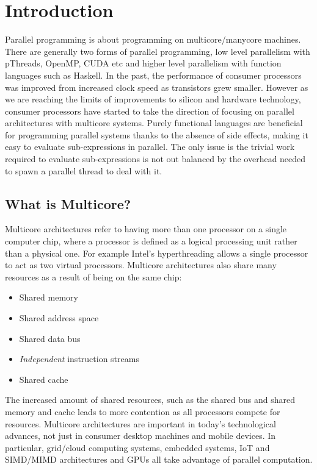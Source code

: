\documentclass[CS4204-Notes.tex]{subfiles}
\begin{document}
\section{Introduction}
Parallel programming is about programming on multicore/manycore machines. There are generally two forms of parallel programming, low level parallelism with pThreads, OpenMP, CUDA etc and higher level parallelism with function languages such as Haskell. 
\n
In the past, the performance of consumer processors was improved from increased clock speed as transistors grew smaller. However as we are reaching the limits of improvements to silicon and hardware technology, consumer processors have started to take the direction of focusing on parallel architectures with multicore systems. Purely functional languages are beneficial for programming parallel systems thanks to the absence of side effects, making it easy to evaluate sub-expressions in parallel. The only issue is the trivial work required to evaluate sub-expressions is not out balanced by the overhead needed to spawn a parallel thread to deal with it. 

\subsection{What is Multicore?}
Multicore architectures refer to having more than one processor on a single computer chip, where a processor is defined as a logical processing unit rather than a physical one. For example Intel's hyperthreading allows a single processor to act as two virtual processors. Multicore architectures also share many resources as a result of being on the same chip:
\begin{itemize}
\item Shared memory
\item Shared address space
\item Shared data bus
\item \textit{Independent} instruction streams
\item Shared cache
\end{itemize}
The increased amount of shared resources, such as the shared bus and shared memory and cache leads to more contention as all processors compete for resources. Multicore architectures are important in today's technological advances, not just in consumer desktop machines and mobile devices. In particular, grid/cloud computing systems, embedded systems, IoT and SIMD/MIMD architectures and GPUs all take advantage of parallel computation. 
\end{document}
